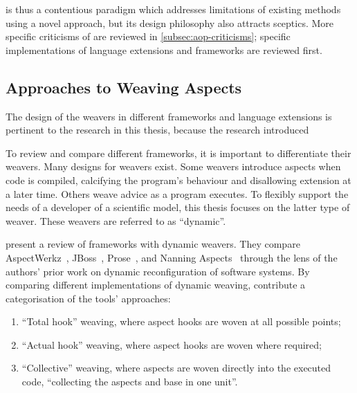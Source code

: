 \Aop{} is thus a contentious paradigm which addresses limitations
of existing methods using a novel approach, but its design philosophy also
attracts sceptics. More specific criticisms of \aop{} are reviewed in
\cref{subsec:aop-criticisms}; specific implementations of \aop{} language
extensions and frameworks are reviewed first.


\subsection{Approaches to Weaving Aspects}
\label{sec:dynamic_aop_review}

The design of the weavers in different \aspectorientation{} frameworks and
language extensions is pertinent to the research in this thesis, because the
research introduced 

To review and compare different \aop{} frameworks, it is important to
differentiate their weavers. Many designs for weavers exist. Some weavers
introduce aspects when code is compiled, calcifying the program's behaviour and
disallowing extension at a later time. Others weave advice as a program
executes. To flexibly support the needs of a developer of a scientific model,
this thesis focuses on the latter type of weaver. These weavers are referred to
as ``dynamic''.

\citet{dynamicAOchitchyan} present a review of \aspectorientation{} frameworks
with dynamic weavers. They compare AspectWerkz~\cite{boner2004aspectwerkz},
JBoss~\cite{fleury2003jboss}, Prose~\cite{popovici2002PROSE}, and Nanning
Aspects~\cite{nanning_aspects_repo} through the lens of the authors' prior work
on dynamic reconfiguration of software systems. By comparing different
implementations of dynamic weaving, \citeauthor{dynamicAOchitchyan} contribute a
categorisation of the tools' approaches:

\begin{enumerate}
\item ``Total hook'' weaving, where aspect hooks are woven at all possible
points;
\item ``Actual hook'' weaving, where aspect hooks are woven where required;
\item ``Collective'' weaving, where aspects are woven directly into the executed
code, ``collecting the aspects and base in one unit''.
\end{enumerate}

